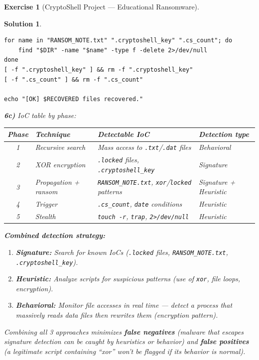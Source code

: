 \documentclass[a4paper,11pt]{article}
\theoremstyle{plain}
\newtheorem{correction}{Solution}
\theoremstyle{definition}
\newtheorem{exercice}{Exercise}
\begin{document}
\begin{exercice}[CryptoShell Project --- Educational Ransomware]
\begin{correction}
\begin{lstlisting}[title=recovery.sh (phase6\_recovery.sh)]
for name in "RANSOM_NOTE.txt" ".cryptoshell_key" ".cs_count"; do
    find "$DIR" -name "$name" -type f -delete 2>/dev/null
done
[ -f ".cryptoshell_key" ] && rm -f ".cryptoshell_key"
[ -f ".cs_count" ] && rm -f ".cs_count"

echo "[OK] $RECOVERED files recovered."
\end{lstlisting}

\textbf{6c)} IoC table by phase:

\begin{center}
\begin{tabular}{clp{4cm}l}
\toprule
\textbf{Phase} & \textbf{Technique} & \textbf{Detectable IoC} & \textbf{Detection type} \\
\midrule
1 & Recursive search & Mass access to \texttt{.txt}/\texttt{.dat} files & Behavioral \\
2 & XOR encryption & \texttt{.locked} files, \texttt{.cryptoshell\_key} & Signature \\
3 & Propagation + ransom & \texttt{RANSOM\_NOTE.txt}, \texttt{xor}/\texttt{locked} patterns & Signature + Heuristic \\
4 & Trigger & \texttt{.cs\_count}, \texttt{date} conditions & Heuristic \\
5 & Stealth & \texttt{touch -r}, \texttt{trap}, \texttt{2>/dev/null} & Heuristic \\
\bottomrule
\end{tabular}
\end{center}

\textbf{Combined detection strategy:}
\begin{enumerate}
    \item \textbf{Signature:} Search for known IoCs (\texttt{.locked} files, \texttt{RANSOM\_NOTE.txt}, \texttt{.cryptoshell\_key}).
    \item \textbf{Heuristic:} Analyze scripts for suspicious patterns (use of \texttt{xor}, file loops, encryption).
    \item \textbf{Behavioral:} Monitor file accesses in real time --- detect a process that massively reads data files then rewrites them (encryption pattern).
\end{enumerate}

Combining all 3 approaches minimizes \textbf{false negatives} (malware that escapes signature detection can be caught by heuristics or behavior) and \textbf{false positives} (a legitimate script containing ``xor'' won't be flagged if its behavior is normal).


\end{correction}
\end{exercice}
\end{document}
